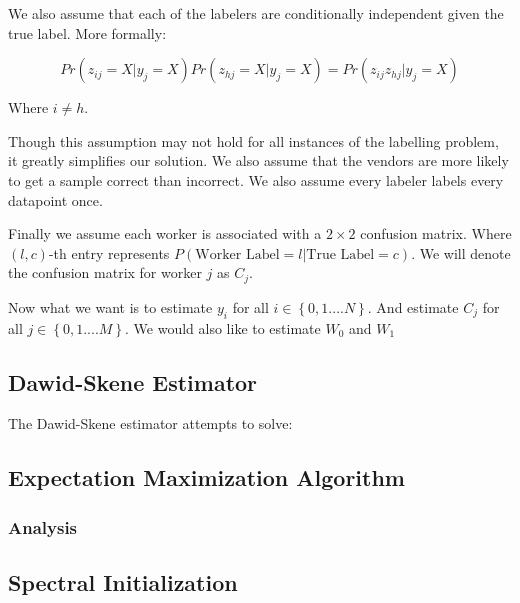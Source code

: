 We also assume that each of the labelers are conditionally independent given the true label. More formally:

$$Pr(z_{ij} = X | y_{j} = X)Pr(z_{hj} = X | y_{j} = X) = Pr(z_{ij}z_{hj} | y_{j} = X)$$

Where $i \neq h$.

Though this assumption may not hold for all instances of the labelling problem, it greatly simplifies our solution. We also assume that the vendors are more likely to get a sample correct than incorrect. We also assume every labeler labels every datapoint once.

Finally we assume each worker is associated with a $2 \times 2$ confusion matrix. Where $(l,c)$-th entry represents $P(\text{Worker Label} = l| \text{True Label} = c)$. We will denote the confusion matrix for worker $j$ as  $C_{j}$.

Now what we want is to estimate $y_{i}$ for all $i \in \left\{0,1....N\right\}$. And estimate $C_{j}$ for all $j \in \left\{0,1....M\right\}$. We would also like to estimate $W_{0}$ and $W_{1}$

\subsection{Dawid-Skene Estimator}
The Dawid-Skene estimator attempts to solve:

\subsection{Expectation Maximization Algorithm}
\subsubsection{Analysis}

\subsection{Spectral Initialization}
